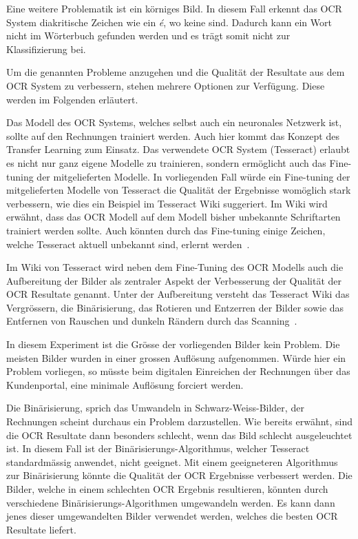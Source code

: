 Eine weitere Problematik ist ein körniges Bild. In diesem Fall erkennt das OCR System diakritische Zeichen wie ein \textit{é}, wo keine sind. Dadurch kann ein Wort nicht im Wörterbuch gefunden werden und es trägt somit nicht zur Klassifizierung bei.

Um die genannten Probleme anzugehen und die Qualität der Resultate aus dem OCR System zu verbessern, stehen mehrere Optionen zur Verfügung. Diese werden im Folgenden erläutert.

Das Modell des OCR Systems, welches selbst auch ein neuronales Netzwerk ist, sollte auf den Rechnungen trainiert werden. Auch hier kommt das Konzept des Transfer Learning zum Einsatz. Das verwendete OCR System (Tesseract) erlaubt es nicht nur ganz eigene Modelle zu trainieren, sondern ermöglicht auch das Fine-tuning der mitgelieferten Modelle. In vorliegenden Fall würde ein Fine-tuning der mitgelieferten Modelle von Tesseract die Qualität der Ergebnisse womöglich stark verbessern, wie dies ein Beispiel im Tesseract Wiki suggeriert. Im Wiki wird erwähnt, dass das OCR Modell auf dem Modell bisher unbekannte Schriftarten trainiert werden sollte. Auch könnten durch das Fine-tuning einige Zeichen, welche Tesseract aktuell unbekannt sind, erlernt werden~\autocite{TesseractTraining}.

Im Wiki von Tesseract wird neben dem Fine-Tuning des OCR Modells auch die Aufbereitung der Bilder als zentraler Aspekt der Verbesserung der Qualität der OCR Resultate genannt. Unter der Aufbereitung versteht das Tesseract Wiki das Vergrössern, die Binärisierung, das Rotieren und Entzerren der Bilder sowie das Entfernen von Rauschen und dunkeln Rändern durch das Scanning~\autocite{TesseractQuality}.

In diesem Experiment ist die Grösse der vorliegenden Bilder kein Problem. Die meisten Bilder wurden in einer grossen Auflösung aufgenommen. Würde hier ein Problem vorliegen, so müsste beim digitalen Einreichen der Rechnungen über das Kundenportal, eine minimale Auflösung forciert werden.

Die Binärisierung, sprich das Umwandeln in Schwarz-Weiss-Bilder, der Rechnungen scheint durchaus ein Problem darzustellen. Wie bereits erwähnt, sind die OCR Resultate dann besonders schlecht, wenn das Bild schlecht ausgeleuchtet ist. In diesem Fall ist der Binärisierungs-Algorithmus, welcher Tesseract standardmässig anwendet, nicht geeignet. Mit einem geeigneteren Algorithmus zur Binärisierung könnte die Qualität der OCR Ergebnisse verbessert werden. Die Bilder, welche in einem schlechten OCR Ergebnis resultieren, könnten durch verschiedene Binärisierungs-Algorithmen umgewandeln werden. Es kann dann jenes dieser umgewandelten Bilder verwendet werden, welches die besten OCR Resultate liefert.


